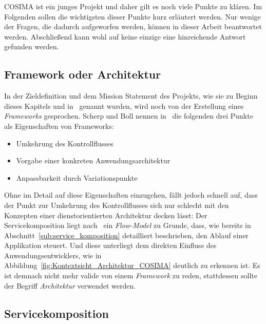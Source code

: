   COSIMA ist ein junges Projekt und daher gilt es noch viele Punkte zu klären. Im Folgenden sollen die wichtigsten dieser Punkte kurz erläutert werden. Nur wenige der Fragen, die dadurch aufgeworfen werden, können in dieser Arbeit beantwortet werden. Abschließend kann wohl auf keine einzige eine hinreichende Antwort gefunden werden.
  
\subsection{Framework oder Architektur} %
\label{sub:framework_oder_architektur}

  In der Zieldefinition und dem Mission Statement des Projekts, wie sie zu Beginn dieses Kapitels und in~\citep{bericht} genannt wurden, wird noch von der Erstellung eines \emph{Frameworks} gesprochen. Scherp und Boll nennen in~\citep[S. 396f]{scherp2006fe} die folgenden drei Punkte als Eigenschaften von Frameworks:
  
  \begin{itemize}
    \item Umkehrung des Kontrollflusses
    \item Vorgabe einer konkreten Anwendungsarchitektur
    \item Anpassbarkeit durch Variationspunkte
  \end{itemize}
  
  Ohne im Detail auf diese Eigenschaften einzugehen, fällt jedoch schnell auf, dass der Punkt zur Umkehrung des Kontrollflusses sich nur schlecht mit den Konzepten einer dienstorientierten Architektur decken lässt: Der Servicekomposition liegt nach~\citep[S. 320]{web_services_principles_and_technology} ein \emph{Flow-Model} zu Grunde, dass, wie bereits in Abschnitt~\ref{sub:service_komposition} detailliert beschrieben, den Ablauf einer Applikation steuert. Und diese unterliegt dem direkten Einfluss des Anwendungsentwicklers, wie in Abbildung~\ref{fig:Kontextsicht_Architektur_COSIMA} deutlich zu erkennen ist. Es ist demnach nicht mehr valide von einem \emph{Framework} zu reden, stattdessen sollte der Begriff \emph{Architektur} verwendet werden.


\subsection{Servicekomposition} %
\label{sub:servicekomposition_fragen}


